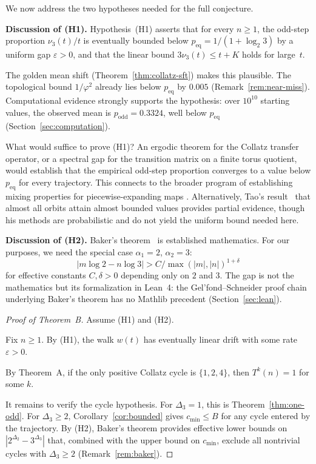 \documentclass[manuscript]{aomart}
\theoremstyle{plain}
\theoremstyle{definition}
\theoremstyle{remark}
\numberwithin{equation}{section}
\begin{document}
We now address the two hypotheses needed for the full conjecture.

\medskip\noindent
\textbf{Discussion of (H1).}
Hypothesis~(H1) asserts that for every $n \ge 1$, the odd-step
proportion $\nu_3(t)/t$ is eventually bounded below
$p_{\mathrm{eq}} = 1/(1+\log_2 3)$ by a uniform gap
$\varepsilon > 0$, and that the linear bound $3\nu_3(t) \le t + K$
holds for large~$t$.

The golden mean shift (Theorem~\ref{thm:collatz-sft}) makes this
plausible.  The topological bound $1/\varphi^2$ already lies below
$p_{\mathrm{eq}}$ by $0.005$ (Remark~\ref{rem:near-miss}).
Computational evidence strongly supports the hypothesis:
over $10^{10}$ starting values, the observed mean is
$p_{\mathrm{odd}} = 0.3324$, well below $p_{\mathrm{eq}}$
(Section~\ref{sec:computation}).

What would suffice to prove (H1)?  An ergodic theorem for the
Collatz transfer operator, or a spectral gap for the transition
matrix on a finite torus quotient, would establish that the empirical
odd-step proportion converges to a value below $p_{\mathrm{eq}}$ for
every trajectory.  This connects to the broader program of
establishing mixing properties for piecewise-expanding maps
\cite{Wirsching1998}.  Alternatively, Tao's result~\cite{Tao2022}
that almost all orbits attain almost bounded values provides partial
evidence, though his methods are probabilistic and do not yield the
uniform bound needed here.

\medskip\noindent
\textbf{Discussion of (H2).}
Baker's theorem~\cite{Baker1975} is established mathematics.  For our
purposes, we need the special case $\alpha_1 = 2$, $\alpha_2 = 3$:
\[
  |m \log 2 - n \log 3| > C / \max(|m|, |n|)^{1+\delta}
\]
for effective constants $C, \delta > 0$ depending only on $2$ and $3$.
The gap is not the mathematics but its formalization in Lean~4: the
Gel'fond--Schneider proof chain underlying Baker's theorem has no
Mathlib precedent (Section~\ref{sec:lean}).

\begin{proof}[Proof of Theorem~B]
Assume (H1) and (H2).

Fix $n \ge 1$.  By (H1), the walk $w(t)$ has eventually linear
drift with some rate $\varepsilon > 0$.

By Theorem~A, if the only positive Collatz cycle is $\{1, 2, 4\}$,
then $T^k(n) = 1$ for some $k$.

It remains to verify the cycle hypothesis.  For $\Delta_3 = 1$, this
is Theorem~\ref{thm:one-odd}.  For $\Delta_3 \ge 2$, Corollary~\ref{cor:bounded} gives
$c_{\min} \le B$ for any cycle entered by the trajectory.  By (H2),
Baker's theorem provides effective lower bounds on
$|2^{\Delta_2} - 3^{\Delta_3}|$ that, combined with the upper bound
on $c_{\min}$, exclude all nontrivial cycles with $\Delta_3 \ge 2$
(Remark~\ref{rem:baker}).
\end{proof}
\end{document}
